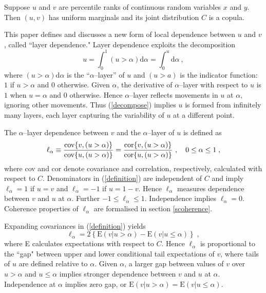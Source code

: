 \documentclass[authoryear]{elsarticle}
\newcommand{\cov}{{\rm cov}}
\newcommand{\E}{{\mathrm E}}
\newcommand{\cor}{\mathrm{cor}}
\newcommand{\de}{\mathrm{d}}
\newcommand{\cq}{\ ,\quad }
\newcommand{\eref}[1]{(\ref{#1})}
\newcommand{\aref}[1]{\ref{#1}}
\begin{document}
Suppose $u$ and $v$ are percentile ranks of continuous random variables $x$ and $y$.  Then $(u,v)$ has uniform marginals and its joint distribution $C$ is a copula.

This paper defines and discusses a new form of local dependence between $u$ and $v$, called ``layer dependence." Layer dependence exploits the decomposition
\begin{equation}\label{decompose}
u=\int_0^1 (u>\alpha) \de \alpha =  \int_0^u \de \alpha \ ,
\end{equation}
where $(u>\alpha) \de \alpha$ is the ``$\alpha$--layer'' of $u$ and $(u>a)$ is the indicator function:  $1$ if $u>\alpha$ and $0$ otherwise. Given $\alpha$, the derivative of $\alpha$--layer with respect to $u$ is $1$ when $u=\alpha$ and $0$ otherwise. Hence $\alpha$--layer reflects movements in $u$ at $\alpha$, ignoring other movements. Thus \eref{decompose} implies $u$ is formed from infinitely many layers, each layer capturing the variability of $u$ at a different point.

The $\alpha$--layer dependence  between $v$ and the $\alpha$--layer of $u$ is defined as
\begin{equation}\label{definition}
\ell_\alpha \equiv \frac{\cov\{v,(u>\alpha)\}}{\cov\{u,(u>\alpha)\}}
=\frac{\cor\{v,(u>\alpha)\}}{\cor\{u,(u>\alpha)\}} \cq 0\leq\alpha\leq 1\;,
\end{equation}
where cov and cor denote covariance and correlation, respectively, calculated with respect to $C$. Denominators in \eref{definition} are independent of $C$ and imply $\ell_\alpha=1$ if $u=v$ and $\ell_\alpha=-1$ if $u=1-v$. Hence $\ell_\alpha$ measures dependence between $v$ and $u$ at $\alpha$. Further $-1\leq \ell_\alpha \leq 1$. Independence implies $\ell_\alpha=0$. Coherence properties of $\ell_\alpha$ are formalised in section \aref{scoherence}.

Expanding covariances in \eref{definition} yields
\begin{equation}\label{gapexp}
\ell_\alpha = 2 \left\{\E(v|u>\alpha)-\E(v|u\leq \alpha)\right\}\;,
\end{equation}
where E calculates expectations with respect to $C$. Hence $\ell_\alpha$ is proportional to the ``gap" between upper and lower conditional tail expectations of $v$, where tails of $u$ are defined relative to $\alpha$. Given $\alpha$, a larger gap between values of $v$ over $u>\alpha$ and $u\leq \alpha$ implies stronger dependence between $v$ and $u$ at $\alpha$. Independence at $\alpha$ implies zero gap, or $\E(v|u>\alpha)=\E(v|u\leq\alpha)$.
\end{document}

